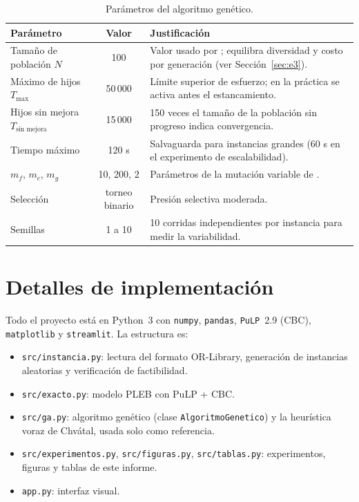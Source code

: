 \documentclass[11pt,a4paper]{article}
\begin{document}
\begin{table}[H]
\centering\small
\caption{Parámetros del algoritmo genético.}\label{tab:param}
\begin{tabularx}{\textwidth}{l c X}
\toprule
Parámetro & Valor & Justificación \\
\midrule
Tamaño de población $N$ & 100 & Valor usado por \citet{beasley1996ga}; equilibra diversidad y costo por generación (ver Sección~\ref{sec:e3}). \\
Máximo de hijos $T_{\max}$ & 50\,000 & Límite superior de esfuerzo; en la práctica se activa antes el estancamiento. \\
Hijos sin mejora $T_{\text{sin mejora}}$ & 15\,000 & 150 veces el tamaño de la población sin progreso indica convergencia. \\
Tiempo máximo & 120 s & Salvaguarda para instancias grandes (60 s en el experimento de escalabilidad). \\
$m_f$, $m_c$, $m_g$ & 10, 200, 2 & Parámetros de la mutación variable de \citet{beasley1996ga}. \\
Selección & torneo binario & Presión selectiva moderada. \\
Semillas & 1 a 10 & 10 corridas independientes por instancia para medir la variabilidad. \\
\bottomrule
\end{tabularx}
\end{table}

\section{Detalles de implementación}
Todo el proyecto está en Python~3 con \texttt{numpy}, \texttt{pandas}, \texttt{PuLP}~2.9 (CBC),
\texttt{matplotlib} y \texttt{streamlit}. La estructura es:
\begin{itemize}[nosep]
  \item \texttt{src/instancia.py}: lectura del formato OR-Library, generación de instancias aleatorias y
  verificación de factibilidad.
  \item \texttt{src/exacto.py}: modelo PLEB con PuLP + CBC.
  \item \texttt{src/ga.py}: algoritmo genético (clase \texttt{AlgoritmoGenetico}) y la heurística voraz de
  Chvátal, usada solo como referencia.
  \item \texttt{src/experimentos.py}, \texttt{src/figuras.py}, \texttt{src/tablas.py}: experimentos, figuras y
  tablas de este informe.
  \item \texttt{app.py}: interfaz visual.
\end{itemize}
\end{document}
